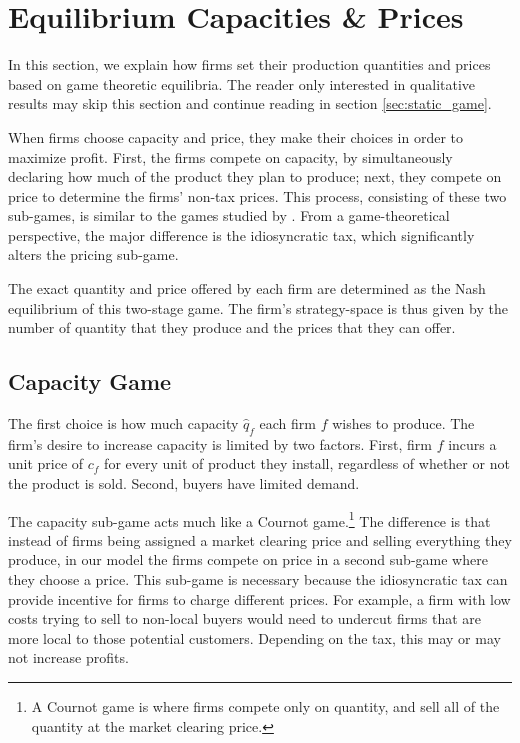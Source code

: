 \documentclass[final,3p,times,authoryear,12pt]{elsarticle}
\begin{document}
\section{Equilibrium Capacities \& Prices}
\label{sec:game_theory} 

In this section, we explain how firms set their production quantities and prices based on game theoretic equilibria. 
The reader only interested in qualitative results may skip this section and continue reading in section \ref{sec:static_game}. 

When firms choose capacity and price, they make their choices in order to maximize profit. 
First, the firms compete on capacity, by simultaneously declaring how much of the product they plan to produce; next, they compete on price to determine the firms' non-tax prices. 
This process, consisting of these two sub-games, is similar to the games studied by \cite{kreps1983quantity}.
From a game-theoretical perspective, the major difference is the idiosyncratic tax, which significantly alters the pricing sub-game.

The exact quantity and price offered by each firm are determined as the Nash equilibrium of this two-stage game. 
The firm's strategy-space is thus given by the number of quantity that they produce and the prices that they can offer. 

\subsection{Capacity Game}
The first choice is how much capacity $\hat q_f$ each firm $f$ wishes to produce.
The firm's desire to increase capacity is limited by two factors.
First, firm $f$ incurs a unit price of $c_f$ for every unit of product they
install, regardless of whether or not the product is sold. 
Second, buyers have limited demand. 

The capacity sub-game acts much like a Cournot game.\footnote{
A Cournot game is where firms compete only on quantity, and sell all of the quantity at the market clearing price.} 
The difference is that instead of firms being assigned a
market clearing price and selling everything they produce, in our model the
firms compete on price in a second sub-game where they choose a price. This
sub-game is necessary because the idiosyncratic tax can provide incentive for
firms to charge different prices. For example, a firm with low costs trying to
sell to non-local buyers would need to undercut firms that are more local to those potential customers. 
Depending on the tax, this may or may not increase profits. 
\end{document}
